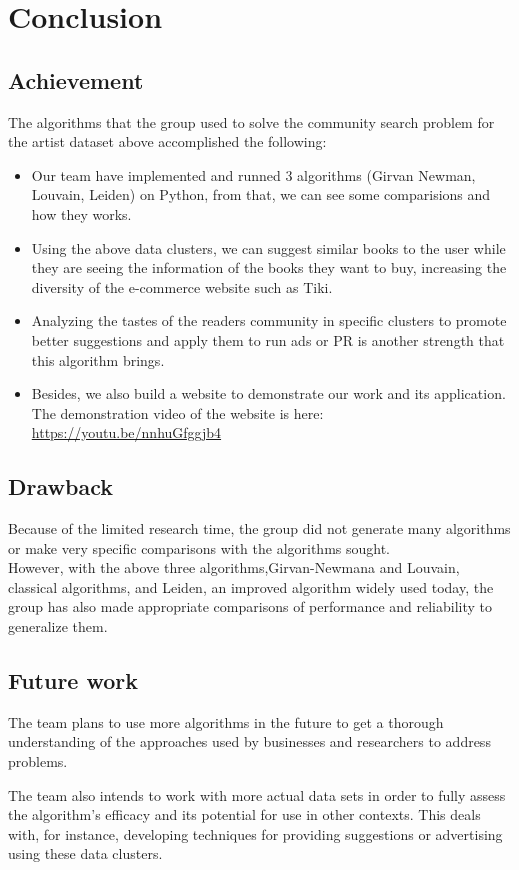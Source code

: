 \section{Conclusion}
\subsection{Achievement}

The algorithms that the group used to solve the community search problem for the artist dataset above accomplished the following:

\begin{itemize}
    \item Our team have implemented and runned 3 algorithms (Girvan Newman, Louvain, Leiden) on Python, from that, we can see some comparisions and how they works.

    \item Using the above data clusters, we can suggest similar books to the user while they are seeing the information of the books they want to buy, increasing the diversity of the e-commerce website such as Tiki.

    \item Analyzing the tastes of the readers community in specific clusters to promote better suggestions and apply them to run ads or PR is another strength that this algorithm brings.

    \item Besides, we also build a website to demonstrate our work and its application. The demonstration video of the website is here: \url{https://youtu.be/nnhuGfggjb4}
\end{itemize}

\subsection{Drawback}
Because of the limited research time, the group did not generate many algorithms or make very specific comparisons with the algorithms sought. \\
However, with the above three algorithms,Girvan-Newmana and Louvain, classical algorithms, and Leiden, an improved algorithm widely used today, the group has also made appropriate comparisons of performance and reliability to generalize them.

\subsection{Future work}
The team plans to use more algorithms in the future to get a thorough understanding of the approaches used by businesses and researchers to address problems.

The team also intends to work with more actual data sets in order to fully assess the algorithm’s efficacy and its potential for use in other contexts. This deals with, for instance, developing techniques for providing suggestions or advertising using these data clusters.